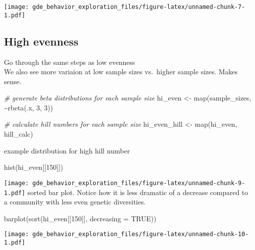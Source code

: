 \documentclass[
]{article}
\newenvironment{Shaded}{\begin{snugshade}}{\end{snugshade}}
\newcommand{\AttributeTok}[1]{\textcolor[rgb]{0.77,0.63,0.00}{#1}}
\newcommand{\CommentTok}[1]{\textcolor[rgb]{0.56,0.35,0.01}{\textit{#1}}}
\newcommand{\ConstantTok}[1]{\textcolor[rgb]{0.00,0.00,0.00}{#1}}
\newcommand{\DecValTok}[1]{\textcolor[rgb]{0.00,0.00,0.81}{#1}}
\newcommand{\FunctionTok}[1]{\textcolor[rgb]{0.00,0.00,0.00}{#1}}
\newcommand{\NormalTok}[1]{#1}
\newcommand{\OtherTok}[1]{\textcolor[rgb]{0.56,0.35,0.01}{#1}}
\newcommand{\SpecialCharTok}[1]{\textcolor[rgb]{0.00,0.00,0.00}{#1}}
\begin{document}
\texttt{[image: gde\_behavior\_exploration\_files/figure-latex/unnamed-chunk-7-1.pdf]}

\hypertarget{high-evenness}{%
\subsection{High evenness}\label{high-evenness}}

Go through the same steps as low evenness\\
We also see more variaion at low sample sizes vs.~higher sample sizes.
Makes sense.

\begin{Shaded}
\begin{Highlighting}[]
\CommentTok{\# generate beta distributions for each sample size }
\NormalTok{hi\_even }\OtherTok{\textless{}{-}} \FunctionTok{map}\NormalTok{(sample\_sizes, }\SpecialCharTok{\textasciitilde{}}\FunctionTok{rbeta}\NormalTok{(.x, }\DecValTok{3}\NormalTok{, }\DecValTok{3}\NormalTok{)) }

\CommentTok{\# calculate hill numbers for each sample size}
\NormalTok{hi\_even\_hill }\OtherTok{\textless{}{-}} \FunctionTok{map}\NormalTok{(hi\_even, hill\_calc)}
\end{Highlighting}
\end{Shaded}

example distribution for high hill number

\begin{Shaded}
\begin{Highlighting}[]
\FunctionTok{hist}\NormalTok{(hi\_even[[}\DecValTok{150}\NormalTok{]])}
\end{Highlighting}
\end{Shaded}

\texttt{[image: gde\_behavior\_exploration\_files/figure-latex/unnamed-chunk-9-1.pdf]}
sorted bar plot. Notice how it is less dramatic of a decrease compared
to a community with less even genetic diversities.

\begin{Shaded}
\begin{Highlighting}[]
\FunctionTok{barplot}\NormalTok{(}\FunctionTok{sort}\NormalTok{(hi\_even[[}\DecValTok{150}\NormalTok{]], }\AttributeTok{decreasing =} \ConstantTok{TRUE}\NormalTok{))}
\end{Highlighting}
\end{Shaded}

\texttt{[image: gde\_behavior\_exploration\_files/figure-latex/unnamed-chunk-10-1.pdf]}
\end{document}
